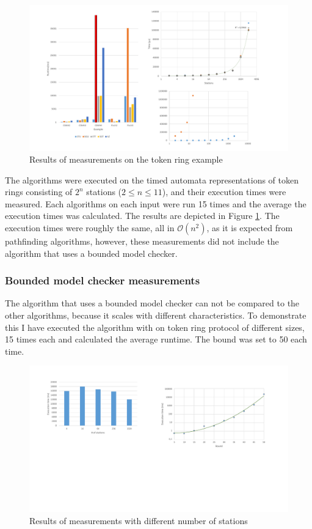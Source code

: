 \begin{figure}
	\centering
	\includegraphics[width=\textwidth]{include/figures/diag_tokenfddi}
	\caption{Results of measurements on the token ring example}
	\label{fig:tokendiag}
\end{figure}

The algorithms were executed on the timed automata representations of token rings consisting of $2^n$ stations ($2 \leq n \leq 11$), and their execution times were measured. Each algorithms on each input were run 15 times and the average the execution times was calculated. The results are depicted in Figure \ref{fig:tokendiag}. The execution times were roughly the same, all in $\mathcal{O}(n^2)$, as it is expected from pathfinding algorithms, however, these measurements did not include the algorithm that uses a bounded model checker.

\subsubsection{Bounded model checker measurements}

The algorithm that uses a bounded model checker can not be compared to the other algorithms, because it scales with different characteristics. To demonstrate this I have executed the algorithm with on token ring protocol of different sizes, 15 times each and calculated the average runtime. The bound was set to 50 each time.

\begin{figure}
	\centering
	\includegraphics[width=\textwidth]{include/figures/diag_bound_station}
	\caption{Results of measurements with different number of stations}
	\label{fig:tokenboundstations}
\end{figure}


